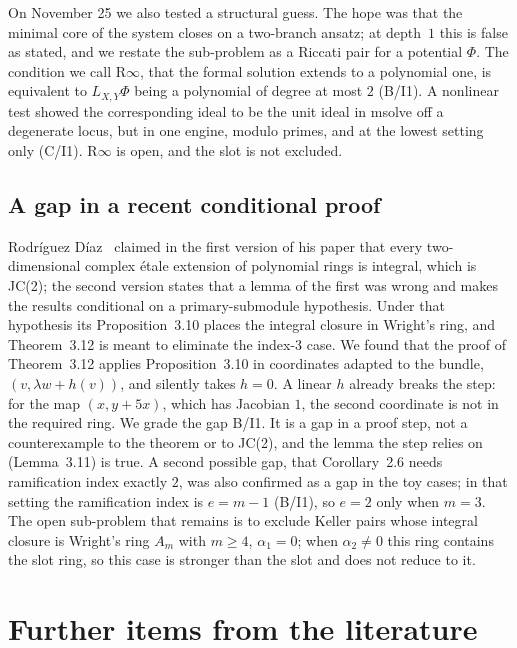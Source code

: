 \documentclass[a4paper,11pt]{article}
\theoremstyle{jsplain}
\theoremstyle{jsdef}
\theoremstyle{jsrem}
\begin{document}
On November 25 we also tested a structural guess. The hope was that the minimal core of the system closes on a two-branch ansatz; at depth~$1$ this is false as stated, and we restate the sub-problem as a Riccati pair for a potential $\Phi$. The condition we call R$\infty$, that the formal solution extends to a polynomial one, is equivalent to $L_{X,Y}\Phi$ being a polynomial of degree at most $2$ (B/I1). A nonlinear test showed the corresponding ideal to be the unit ideal in msolve off a degenerate locus, but in one engine, modulo primes, and at the lowest setting only (C/I1). R$\infty$ is open, and the slot is not excluded.

\subsection{A gap in a recent conditional proof}

Rodríguez Díaz~\cite{RD2024} claimed in the first version of his paper that every two-dimensional complex étale extension of polynomial rings is integral, which is JC(2); the second version states that a lemma of the first was wrong and makes the results conditional on a primary-submodule hypothesis. Under that hypothesis its Proposition~3.10 places the integral closure in Wright's ring, and Theorem~3.12 is meant to eliminate the index-3 case. We found that the proof of Theorem~3.12 applies Proposition~3.10 in coordinates adapted to the bundle, $(v,\lambda w+h(v))$, and silently takes $h=0$. A linear $h$ already breaks the step: for the map $(x,y+5x)$, which has Jacobian $1$, the second coordinate is not in the required ring. We grade the gap B/I1. It is a gap in a proof step, not a counterexample to the theorem or to JC(2), and the lemma the step relies on (Lemma~3.11) is true. A second possible gap, that Corollary~2.6 needs ramification index exactly $2$, was also confirmed as a gap in the toy cases; in that setting the ramification index is $e=m-1$ (B/I1), so $e=2$ only when $m=3$. The open sub-problem that remains is to exclude Keller pairs whose integral closure is Wright's ring $A_m$ with $m\ge4$, $\alpha_1=0$; when $\alpha_2\ne0$ this ring contains the slot ring, so this case is stronger than the slot and does not reduce to it.

\section{Further items from the literature}\label{rp:sec:other}
\end{document}
